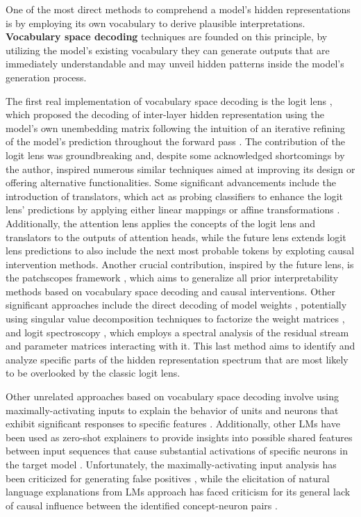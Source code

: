 One of the most direct methods to comprehend a model's hidden representations is by employing its own vocabulary to derive plausible interpretations. \textbf{Vocabulary space decoding} techniques are founded on this principle, by utilizing the model's existing vocabulary they can generate outputs that are immediately understandable and may unveil hidden patterns inside the model's generation process.

The first real implementation of vocabulary space decoding is the logit lens , which proposed the decoding of inter-layer hidden representation using the model's own unembedding matrix following the intuition of an iterative refining of the model's prediction throughout the forward pass .
The contribution of the logit lens was groundbreaking and, despite some acknowledged shortcomings by the author, inspired numerous similar techniques aimed at improving its design or offering alternative functionalities.
Some significant advancements include the introduction of translators, which act as probing classifiers to enhance the logit lens' predictions by applying either linear mappings  or affine transformations .
Additionally, the attention lens  applies the concepts of the logit lens and translators to the outputs of attention heads, while the future lens  extends logit lens predictions to also include the next most probable tokens by exploting causal intervention methods.
Another crucial contribution, inspired by the future lens, is the patchscopes framework , which aims to generalize all prior interpretability methods based on vocabulary space decoding and causal interventions.
Other significant approaches include the direct decoding of model weights , potentially using singular value decomposition techniques to factorize the weight matrices , and logit spectroscopy , which employs a spectral analysis of the residual stream and parameter matrices interacting with it.
This last method aims to identify and analyze specific parts of the hidden representation spectrum that are most likely to be overlooked by the classic logit lens.


Other unrelated approaches based on vocabulary space decoding involve using maximally-activating inputs to explain the behavior of units and neurons that exhibit significant responses to specific features .
Additionally, other LMs have been used as zero-shot explainers to provide insights into possible shared features between input sequences that cause substantial activations of specific neurons in the target model .
Unfortunately, the maximally-activating input analysis has been criticized for generating false positives , while the elicitation of natural language explanations from LMs approach has faced criticism for its general lack of causal influence between the identified concept-neuron pairs .